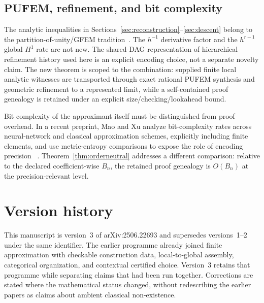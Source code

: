 \documentclass[11pt]{article}
\theoremstyle{definition}
\begin{document}
\subsection{PUFEM, refinement, and bit complexity}

The analytic inequalities in Sections~\ref{sec:reconstruction}--\ref{sec:descent} belong to the
partition-of-unity/GFEM tradition~\cite{MelenkBabuska96,BabuskaMelenk}.  The $h^{-1}$ derivative
factor and the $h^{r-1}$ global $H^1$ rate are not new.  The shared-DAG representation of hierarchical
refinement history used here is an explicit encoding choice, not a separate novelty claim.  The new
theorem is scoped to the combination: supplied finite local analytic witnesses are transported through
exact rational PUFEM synthesis and geometric refinement to a represented limit, while a self-contained
proof genealogy is retained under an explicit size/checking/lookahead bound.

Bit complexity of the approximant itself must be distinguished from proof overhead.  In a recent preprint, Mao and Xu
analyze bit-complexity rates across neural-network and classical approximation schemes, explicitly
including finite elements, and use metric-entropy comparisons to expose the role of encoding precision
~\cite{MaoXu2026}.  Theorem~\ref{thm:orderneutral} addresses a different comparison: relative to the
declared coefficient-wise $B_n$, the retained proof genealogy is $O(B_n)$ at the precision-relevant level.

\section{Version history}\label{sec:versions}

This manuscript is version~3 of arXiv:2506.22693 and supersedes versions~1--2 under the
same identifier.  The earlier programme already joined finite approximation with checkable
construction data, local-to-global assembly, categorical organization, and contextual
certified choice.  Version~3 retains that programme while separating claims that had been
run together.  Corrections are stated where the mathematical status changed, without
redescribing the earlier papers as claims about ambient classical non-existence.
\end{document}
